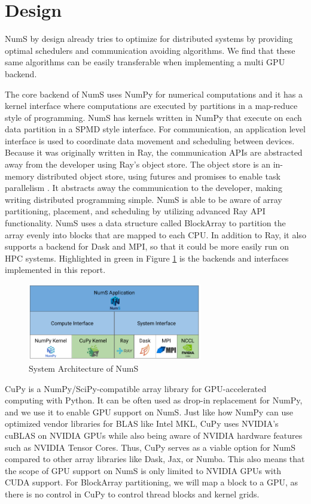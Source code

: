 \documentclass{article}
\begin{document}
\section{Design}
NumS by design already tries to optimize for distributed systems by providing optimal schedulers and communication avoiding algorithms. \cite{nums} We find that these same algorithms can be easily transferable when implementing a multi GPU backend.

The core backend of NumS uses NumPy for numerical computations and it has a kernel interface where computations are executed by partitions in a map-reduce style of programming. NumS has kernels written in NumPy that execute on each data partition in a SPMD style interface. For communication, an application level interface is used to coordinate data movement and scheduling between devices. Because it was originally written in Ray, the communication APIs are abstracted away from the developer using Ray's object store. The object store is an in-memory distributed object store, using futures and promises to enable task parallelism \cite{ray}. It abstracts away the communication to the developer, making writing distributed programming simple. NumS is able to be aware of array partitioning, placement, and scheduling by utilizing advanced Ray API functionality. NumS uses a data structure called BlockArray to partition the array evenly into blocks that are mapped to each CPU. In addition to Ray, it also supports a backend for Dask and MPI, so that it could be more easily run on HPC systems. Highlighted in green in Figure \ref{fig:system_arch} is the backends and interfaces implemented in this report.

\begin{figure}
  \centerline{\includegraphics[width=3in]{figures/system_architecture.png}}
  \caption{System Architecture of NumS}
  \label{fig:system_arch}
\end{figure}

CuPy is a NumPy/SciPy-compatible array library for GPU-accelerated computing with Python. It can be often used as drop-in replacement for NumPy, and we use it to enable GPU support on NumS. \cite{cupy} Just like how NumPy can use optimized vendor libraries for BLAS like Intel MKL, CuPy uses NVIDIA's cuBLAS on NVIDIA GPUs while also being aware of NVIDIA hardware features such as NVIDIA Tensor Cores. Thus, CuPy serves as a viable option for NumS compared to other array libraries like Dask, Jax, or Numba. This also means that the scope of GPU support on NumS is only limited to NVIDIA GPUs with CUDA support. For BlockArray partitioning, we will map a block to a GPU, as there is no control in CuPy to control thread blocks and kernel grids. 
\end{document}
